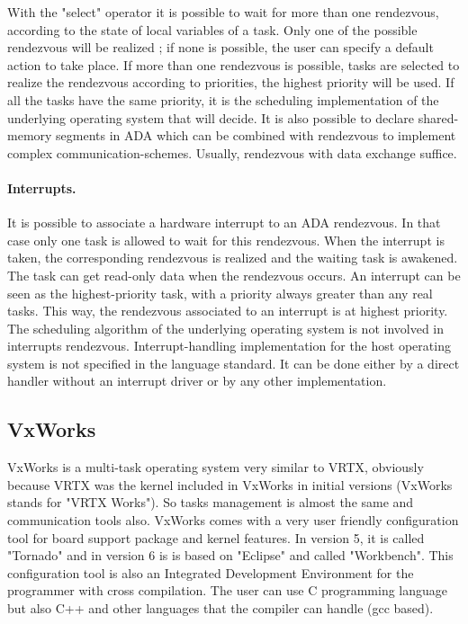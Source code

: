 \documentclass[10pt]{report}
\begin{document}
With the "select" operator it is possible to wait for more than one rendezvous, according to the state of local variables of a task.
Only one of the possible rendezvous will be realized ; if none is possible, the user can specify a default action to take place. If more than
one rendezvous is possible, tasks are selected to realize the rendezvous according to priorities, the highest priority will be
used. If all the tasks have the same priority, it is the scheduling implementation of the underlying operating system
that will decide. It is also possible to declare shared-memory segments in ADA which can be combined with rendezvous to
implement complex communication-schemes. Usually, rendezvous with data exchange suffice.

\paragraph{Interrupts.} It is possible to associate a hardware interrupt to an ADA rendezvous. In that case only one task is allowed
to wait for this rendezvous. When the interrupt is taken, the corresponding rendezvous is realized and the waiting
task is awakened. The task can get read-only data when the rendezvous occurs. An interrupt can be seen as the highest-priority 
task, with a priority always greater than any real tasks. This way, the rendezvous associated to an interrupt is at highest priority.
The scheduling algorithm of the underlying operating system is not involved in interrupts rendezvous. Interrupt-handling
implementation for the host operating system is not specified in the language standard. It can be done either by a direct handler without
an interrupt driver or by any other implementation.

\subsection{VxWorks}

VxWorks is a multi-task operating system very similar to VRTX, obviously because VRTX was the kernel included in VxWorks in
initial versions (VxWorks stands for "VRTX Works"). So tasks management is almost the same and communication tools also.
VxWorks comes with a very user friendly configuration tool for board support package and kernel features. In version 5, it is
called "Tornado" and in version 6 is is based on "Eclipse" and called "Workbench". This configuration tool is also an
Integrated Development Environment for the programmer with cross compilation. The user can use C programming language but also
C++ and other languages that the compiler can handle (gcc based).
\end{document}
